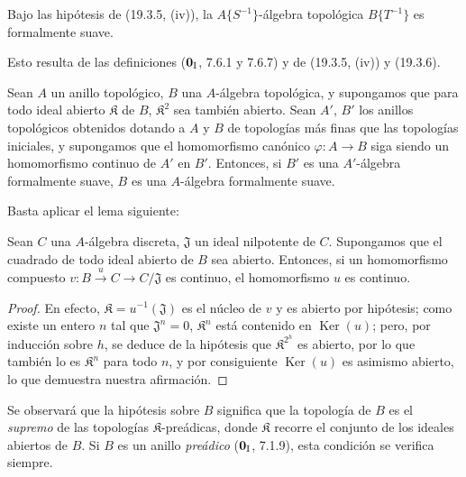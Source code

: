 \begin{corollary}[19.3.7]
\label{0.19.3.7-fr}
Bajo las hipótesis de \textup{(19.3.5, (iv))}, la $A\{S^{-1}\}$-álgebra topológica
$B\{T^{-1}\}$ es formalmente suave.
\end{corollary}

Esto resulta de las definiciones ($\mathbf 0_{\rm I}$, 7.6.1 y 7.6.7) y de
(19.3.5, (iv)) y (19.3.6).

\begin{proposition}[19.3.8]
\label{0.19.3.8-fr}
Sean $A$ un anillo topológico, $B$ una $A$-álgebra topológica, y supongamos
que para todo ideal abierto $\mathfrak K$ de $B$, $\mathfrak K^2$ sea también
abierto. Sean $A'$, $B'$ los anillos topológicos obtenidos dotando a $A$ y
$B$ de topologías más finas que las topologías iniciales, y supongamos que
el homomorfismo canónico $\varphi:A\to B$ siga siendo un homomorfismo
continuo de $A'$ en $B'$. Entonces, si $B'$ es una $A'$-álgebra formalmente
suave, $B$ es una $A$-álgebra formalmente suave.
\end{proposition}

Basta aplicar el lema siguiente:

\begin{lemma}[19.3.8.1]
\label{0.19.3.8.1-fr}
Sean $C$ una $A$-álgebra discreta, $\mathfrak J$ un ideal nilpotente de $C$.
Supongamos que el cuadrado de todo ideal abierto de $B$ sea abierto. Entonces, si un
homomorfismo compuesto
$v:B\xrightarrow{u}C\to C/\mathfrak J$ es continuo, el homomorfismo $u$
es continuo.
\end{lemma}

\begin{proof}
En efecto, $\mathfrak K=u^{-1}(\mathfrak J)$ es el núcleo de $v$ y es
abierto por hipótesis; como existe un entero $n$ tal que
$\mathfrak J^n=0$, $\mathfrak K^n$ está contenido en
$\operatorname{Ker}(u)$; pero, por inducción sobre $h$, se deduce de
la hipótesis que $\mathfrak K^{2^h}$ es abierto, por lo que también lo es
$\mathfrak K^n$ para todo $n$, y por consiguiente $\operatorname{Ker}(u)$ es
asimismo abierto, lo que demuestra nuestra afirmación.
\end{proof}

Se observará que la hipótesis sobre $B$ significa que la topología de $B$ es el
\emph{supremo} de las topologías $\mathfrak K$-preádicas, donde $\mathfrak K$ recorre
el conjunto de los ideales abiertos de $B$. Si $B$ es un anillo \emph{preádico}
($\mathbf 0_{\rm I}$, 7.1.9), esta condición se verifica siempre.


